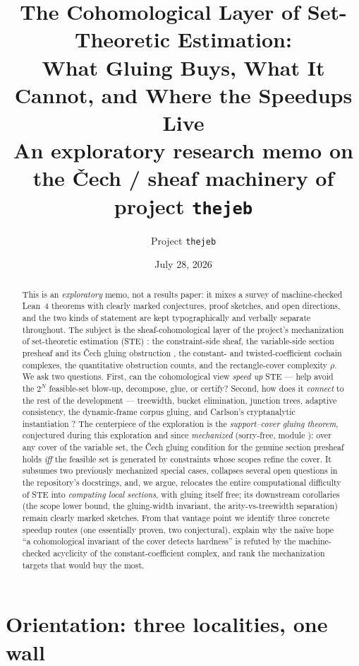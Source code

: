 \documentclass[11pt]{article}
\title{The Cohomological Layer of Set-Theoretic Estimation:\\
What Gluing Buys, What It Cannot, and Where the Speedups Live\\
\large An exploratory research memo on the \v{C}ech / sheaf machinery of
project \texttt{thejeb}}
\author{Project \texttt{thejeb}}
\date{July 28, 2026}
\newcommand{\rectrho}{\rho}
\begin{document}
\maketitle

\begin{abstract}
This is an \emph{exploratory} memo, not a results paper: it mixes a
survey of machine-checked Lean~4 theorems with clearly marked
conjectures, proof sketches, and open directions, and the two kinds of
statement are kept typographically and verbally separate throughout.
The subject is the sheaf-cohomological layer of the project's
mechanization of set-theoretic estimation (STE)
\citep{combettes1993}: the constraint-side sheaf, the variable-side
section presheaf and its \v{C}ech gluing obstruction
\citep{abramsky2011sheaf,abramsky2012cohomology}, the constant- and
twisted-coefficient cochain complexes, the quantitative obstruction
counts, and the rectangle-cover complexity $\rectrho$.  We ask two
questions.  First, can the cohomological view \emph{speed up} STE ---
help avoid the $2^N$ feasible-set blow-up, decompose, glue, or certify?
Second, how does it \emph{connect} to the rest of the development ---
treewidth, bucket elimination, junction trees, adaptive consistency,
the dynamic-frame corpus gluing, and Carlson's cryptanalytic
instantiation \citep{carlson2012}?  The centerpiece of the exploration
is the \emph{support--cover gluing theorem}, conjectured during this
exploration and since \emph{mechanized} (sorry-free, module
): over any cover of the variable set, the
\v{C}ech gluing condition for the genuine section presheaf holds
\emph{iff} the feasible set is generated by constraints whose scopes
refine the cover.  It subsumes two previously mechanized special
cases, collapses several open questions in the repository's
docstrings, and, we argue, relocates the entire computational
difficulty of STE into \emph{computing local sections}, with gluing
itself free; its downstream corollaries (the scope lower bound, the
gluing-width invariant, the arity-vs-treewidth separation) remain
clearly marked sketches.  From that vantage point we
identify three concrete speedup routes (one essentially proven, two
conjectural), explain why the na\"ive hope ``a cohomological invariant
of the cover detects hardness'' is refuted by the machine-checked
acyclicity of the constant-coefficient complex, and rank the
mechanization targets that would buy the most.
\end{abstract}

\section{Orientation: three localities, one wall}
\label{sec:orientation}
\end{document}
